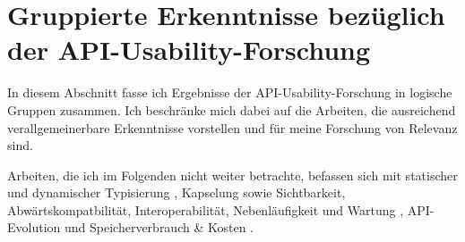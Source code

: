 \section{Gruppierte Erkenntnisse bezüglich der API-Usability-Forschung}
\label{sec:forschung-einzelne-ergebnisse}

In diesem Abschnitt fasse ich Ergebnisse der API-Usability-Forschung in logische Gruppen zusammen. Ich beschränke mich dabei auf die Arbeiten, die ausreichend verallgemeinerbare Erkenntnisse vorstellen und für meine Forschung von Relevanz sind.

Arbeiten, die ich im Folgenden nicht weiter betrachte, befassen sich mit statischer und dynamischer Typisierung \citep{Mayer:2012kl}, Kapselung \citep{Schmidt:br,Roberts:1997tt,Stylos:2008jt,Piccioni:2013uq} sowie Sichtbarkeit, Abwärtskompatbilität, Interoperabilität, Nebenläufigkeit und Wartung \citep{Zibran:2011fx}, API-Evolution \citep{Ng:2007gh} und Speicherverbrauch \& Kosten \citep{Henning:2007kg}.



  
  
  
  
    
  
